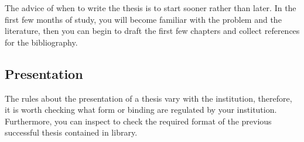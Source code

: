 The advice of when to write the thesis is to start sooner rather than later. In the first few months of study, you will become familiar with the problem and the literature, then you can begin to draft the first few chapters and collect references for the bibliography.


\subsection{Presentation}
The rules about the presentation of a thesis vary with the institution, therefore, it is worth checking what form or binding are regulated by your institution. Furthermore, you can inspect to check the required format of the previous successful thesis contained in library.
